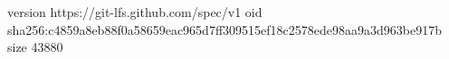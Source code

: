 version https://git-lfs.github.com/spec/v1
oid sha256:c4859a8eb88f0a58659eac965d7ff309515ef18c2578ede98aa9a3d963be917b
size 43880

